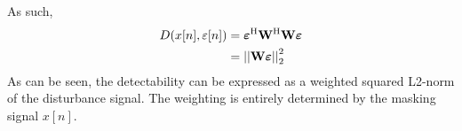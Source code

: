 As such, 
\begin{align}
    D(x[n],\varepsilon[n]) &= \vecsymbol{\varepsilon}\herm\mat{W}\herm\mat{W}\vecsymbol{\varepsilon} \\
                           &= \norm[2][2]{\mat{W}\vecsymbol{\varepsilon}} 
\end{align}
As can be seen, the detectability can be expressed as a weighted squared L2-norm of the disturbance signal. 
The weighting is entirely determined by the masking signal $x[n]$. 

